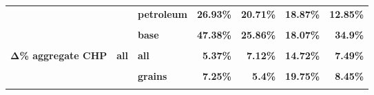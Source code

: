 \documentclass[
  authoryear,
  preprint,
  3p]{elsarticle}
\begin{document}
\begin{longtable}[t]{>{}l>{}l>{}l>{}r>{}r>{}r>{}r}
\textbf{} & \textbf{} & \textbf{petroleum} & \textcolor[HTML]{4285f4}{\textbf{26.93\%}} & \textcolor[HTML]{4285f4}{\textbf{20.71\%}} & \textcolor[HTML]{4285f4}{\textbf{18.87\%}} & \textcolor[HTML]{4285f4}{\textbf{12.85\%}}\\
\textbf{\cellcolor{gray!10}{}} & \textbf{\cellcolor{gray!10}{metals}} & \textbf{\cellcolor{gray!10}{all}} & \textcolor[HTML]{4285f4}{\textbf{\cellcolor{gray!10}{28.12\%}}} & \textcolor[HTML]{4285f4}{\textbf{\cellcolor{gray!10}{19.1\%}}} & \textcolor[HTML]{4285f4}{\textbf{\cellcolor{gray!10}{23.27\%}}} & \textcolor[HTML]{4285f4}{\textbf{\cellcolor{gray!10}{37.32\%}}}\\
\textbf{} & \textbf{} & \textbf{base} & \textcolor[HTML]{4285f4}{\textbf{47.38\%}} & \textcolor[HTML]{4285f4}{\textbf{25.86\%}} & \textcolor[HTML]{4285f4}{\textbf{18.07\%}} & \textcolor[HTML]{4285f4}{\textbf{34.9\%}}\\
\addlinespace
\textbf{\cellcolor{gray!10}{}} & \textbf{\cellcolor{gray!10}{}} & \textbf{\cellcolor{gray!10}{precious}} & \textcolor[HTML]{4285f4}{\textbf{\cellcolor{gray!10}{23.3\%}}} & \textcolor[HTML]{4285f4}{\textbf{\cellcolor{gray!10}{17.41\%}}} & \textcolor[HTML]{4285f4}{\textbf{\cellcolor{gray!10}{24.57\%}}} & \textcolor[HTML]{4285f4}{\textbf{\cellcolor{gray!10}{37.93\%}}}\\
\textbf{Δ\% aggregate CHP} & \textbf{all} & \textbf{all} & \textcolor[HTML]{4285f4}{\textbf{5.37\%}} & \textcolor[HTML]{4285f4}{\textbf{7.12\%}} & \textcolor[HTML]{4285f4}{\textbf{14.72\%}} & \textcolor[HTML]{4285f4}{\textbf{7.49\%}}\\
\textbf{\cellcolor{gray!10}{}} & \textbf{\cellcolor{gray!10}{agriculturals}} & \textbf{\cellcolor{gray!10}{all}} & \textcolor[HTML]{4285f4}{\textbf{\cellcolor{gray!10}{4.91\%}}} & \textcolor[HTML]{4285f4}{\textbf{\cellcolor{gray!10}{4.5\%}}} & \textcolor[HTML]{4285f4}{\textbf{\cellcolor{gray!10}{12.14\%}}} & \textcolor[HTML]{4285f4}{\textbf{\cellcolor{gray!10}{6.23\%}}}\\
\textbf{} & \textbf{} & \textbf{grains} & \textcolor[HTML]{4285f4}{\textbf{7.25\%}} & \textcolor[HTML]{4285f4}{\textbf{5.4\%}} & \textcolor[HTML]{4285f4}{\textbf{19.75\%}} & \textcolor[HTML]{4285f4}{\textbf{8.45\%}}\\
\textbf{\cellcolor{gray!10}{}} & \textbf{\cellcolor{gray!10}{}} & \textbf{\cellcolor{gray!10}{livestock}} & \textcolor[HTML]{4285f4}{\textbf{\cellcolor{gray!10}{1.35\%}}} & \textcolor[HTML]{4285f4}{\textbf{\cellcolor{gray!10}{0.41\%}}} & \textcolor[HTML]{4285f4}{\textbf{\cellcolor{gray!10}{0.52\%}}} & \textcolor[HTML]{4285f4}{\textbf{\cellcolor{gray!10}{0.26\%}}}\\

\end{longtable}
\end{document}

